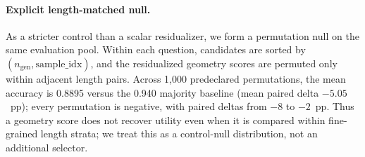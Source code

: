\begin{table}[tbp]
\centering
\scriptsize
\setlength{\tabcolsep}{1.0pt}
\caption{Retrospective same-candidate-pool \textsc{GeoVote} audit on 50
held-out GSM8K questions ($K{=}8$).  Every non-majority row is paired against
majority on the identical candidates.  Majority is the text-only
answer-frequency control, and shortest-output is the token-count-only control.
CI is a paired bootstrap interval; R/B denotes repairs/breaks relative to
majority.  Exact $p$ is the paired sign test; $p_{\mathrm{Holm}}$ corrects over
the five non-majority comparisons.}
\label{tab:geovote-audit}
\end{table}

\paragraph{Explicit length-matched null.}
As a stricter control than a scalar residualizer, we form a permutation null on
the same evaluation pool.  Within each question, candidates are sorted by
$(n_{\mathrm{gen}},\mathrm{sample\_idx})$, and the residualized geometry scores
are permuted only within adjacent length pairs.  Across 1,000
predeclared permutations, the mean accuracy is 0.8895 versus the 0.940 majority
baseline (mean paired delta $-5.05$~pp); every permutation is negative, with
paired deltas from $-8$ to $-2$~pp.  Thus a geometry score does not recover
utility even when it is compared within fine-grained length strata; we treat
this as a control-null distribution, not an additional selector.

